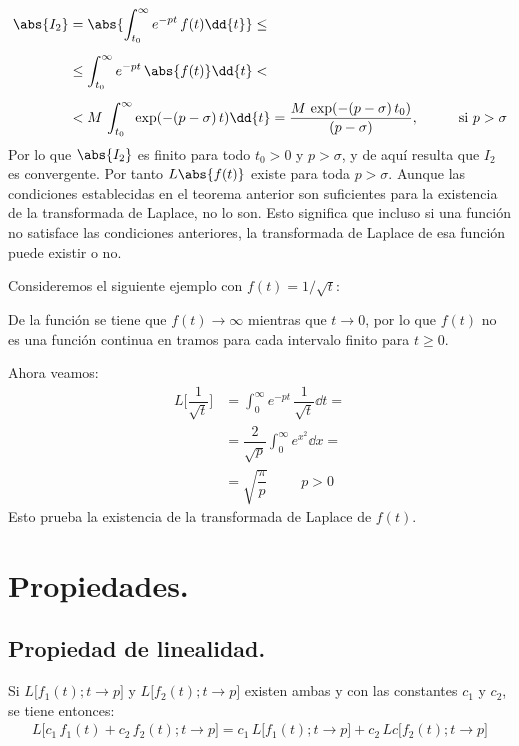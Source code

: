 \begin{align*}
\abs{I_{2}} &= \abs{\int_{t_{0}}^{\infty} e^{- p t} \, f(t) \dd{t}} \leq \\[0.5em]
&\leq \int_{t_{0}}^{\infty} e^{- p t} \, \abs{f(t)} \dd{t} < \\[0.5em]
&< M \, \int_{t_{0}}^{\infty} \exp(-(p - \sigma) \, t) \dd{t} = \dfrac{M \, \exp(-(p - \sigma) \, t_{0})}{(p - \sigma)}, \hspace{1cm} \mbox{si  } p > \sigma
\end{align*}
Por lo que $\abs{I_{2}}$ es finito para todo $t_{0} > 0$ y $p > \sigma$, y de aquí resulta que $I_{2}$ es convergente. Por tanto $L\abs{f(t)}$ existe para toda $p > \sigma$.
Aunque las condiciones establecidas en el teorema anterior son suficientes para la existencia de la transformada de Laplace, no lo son. Esto significa que incluso si una función no satisface las condiciones anteriores, la transformada de Laplace de esa función puede existir o no. 
\par
Consideremos el siguiente ejemplo con $f(t) = 1 / \sqrt{t}$:
\par
De la función se tiene que $f(t) \to \infty$ mientras que $t \to 0$, por lo que $f(t)$ no es una función continua en tramos para cada intervalo finito para $t \geq 0$.
\par
Ahora veamos:
\begin{align*}
L \big[\dfrac{1}{\sqrt{t}}\big] &= \int_{0}^{\infty} e^{-p t} \, \dfrac{1}{\sqrt{t}} \dd{t} = \\[0.5em]
&= \dfrac{2}{\sqrt{p}} \int_{0}^{\infty} e^{x^{2}} \dd{x} = \\[0.5em]
&= \sqrt{\dfrac{\pi}{p}} \hspace{1cm} p > 0
\end{align*}
Esto prueba la existencia de la transformada de Laplace de $f(t)$.

\section{Propiedades.}

\subsection{Propiedad de linealidad.}

Si $L \big[f_{1}(t); t \to p\big]$ y $L \big[f_{2}(t); t \to p\big]$ existen ambas y con las constantes $c_{1}$ y $c_{2}$, se tiene entonces:
\begin{align*}
L \big[c_{1} \, f_{1}(t) + c_{2} \, f_{2}(t) ; t \to p\big] = c_{1} \, L \big[f_{1}(t); t \to p\big] + c_{2} \, L c\big[f_{2}(t); t \to p\big]
\end{align*}


